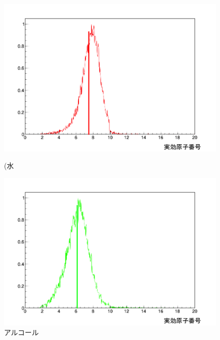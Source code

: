 \begin{figure}[H]
 \begin{minipage}{0.5\hsize}
  \begin{center}
   \includegraphics[bb=0.000000 0.000000 618.188896 429.564489,width=1.0\hsize]{image2/chapter5/Z_water.png}
  \end{center}  
\vspace{-1cm}
\caption*{(水}
 \end{minipage}
 \begin{minipage}{0.5\hsize}
  \begin{center}
   \includegraphics[bb=0.000000 0.000000 618.188896 429.564489,width=1.0\hsize]{image2/chapter5/Z_alcohol.png}
  \end{center}
\vspace{-1cm}
\caption*{アルコール}
 \end{minipage}

\end{figure}
